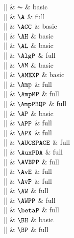|\AC|    & $\AC$ & basic \\

|\A|    & $\A$ & full \\

|\ACC|    & $\ACC$ & basic \\

|\AH|    & $\AH$ & basic \\

|\AL|    & $\AL$ & basic \\

|\AlgP|    & $\AlgP$ & full \\

|\AM|    & $\AM$ & basic \\

|\AMEXP|    & $\AMEXP$ & basic \\

|\Amp|    & $\Amp$ & full \\

|\AmpMP|    & $\AmpMP$ & full \\

|\AmpPBQP|    & $\AmpPBQP$ & full \\

|\AP|    & $\AP$ & basic \\

|\APP|    & $\APP$ & full \\

|\APX|    & $\APX$ & full \\

|\AUCSPACE|    & $\AUCSPACE$ & full \\

|\AuxPDA|    & $\AuxPDA$ & full \\

|\AVBPP|    & $\AVBPP$ & full \\

|\AvE|    & $\AvE$ & full \\

|\AvP|    & $\AvP$ & full \\

|\AW|    & $\AW$ & full \\

|\AWPP|    & $\AWPP$ & full \\

|\betaP|    & $\betaP$ & full \\

|\BH|    & $\BH$ & basic \\

|\BP|    & $\BP$ & full \\

